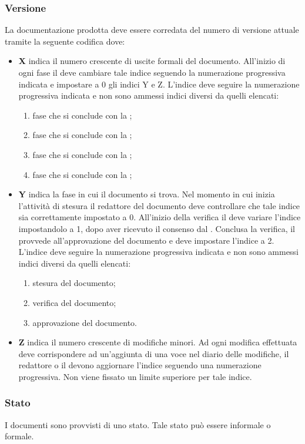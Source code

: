 \documentclass[12pt,a4paper]{article}
\begin{document}
\subsubsection{Versione} \label{Versione}
La documentazione prodotta deve essere corredata del numero di versione attuale tramite la seguente codifica  dove:
\begin{itemize}
	\item \textbf{X} indica il numero crescente di uscite formali del documento. All'inizio di ogni fase il \PM deve cambiare tale indice seguendo la numerazione progressiva indicata e impostare a 0 gli indici Y e Z. L'indice deve seguire la numerazione progressiva indicata e non sono ammessi indici diversi da quelli elencati:
	\begin{enumerate}
		\item fase che si conclude con la \RR;
		\item fase che si conclude con la \RP;
		\item fase che si conclude con la \RQ;
		\item fase che si conclude con la \RA;
	\end{enumerate}
	\item \textbf{Y} indica la fase in cui il documento si trova. Nel momento in cui inizia l'attività di stesura il redattore del documento deve controllare che tale indice sia correttamente impostato a 0. All'inizio della verifica il \VR{} deve variare l'indice impostandolo a 1, dopo aver ricevuto il consenso dal \PM. Conclusa la verifica, il \PM{} provvede all'approvazione del documento e deve impostare l'indice a 2. L'indice deve seguire la numerazione progressiva indicata e non sono ammessi indici diversi da quelli elencati:
	\begin{enumerate}[start=0]
		\item stesura del documento;
		\item verifica del documento;
		\item approvazione del documento.
	\end{enumerate}
	\item \textbf{Z} indica il numero crescente di modifiche minori. Ad ogni modifica effettuata deve corrispondere ad un'aggiunta di una voce nel diario delle modifiche, il redattore o il \VR devono aggiornare l'indice seguendo una numerazione progressiva. Non viene fissato un limite superiore per tale indice.
\end{itemize}

\subsubsection{Stato}
I documenti sono provvisti di uno stato. Tale stato può essere informale o formale.
\end{document}
